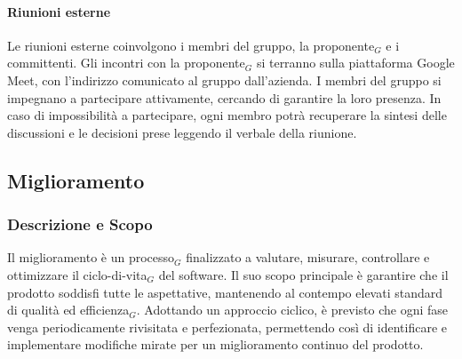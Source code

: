 \documentclass[10pt]{article}
\begin{document}
\begin{justify}
        \paragraph{Riunioni esterne}
        Le riunioni esterne coinvolgono i membri del gruppo, la proponente$_G$ e i committenti. Gli incontri con la proponente$_G$ si terranno sulla piattaforma Google Meet, con l'indirizzo comunicato al gruppo dall'azienda. I membri del gruppo si impegnano a partecipare attivamente, cercando di garantire la loro presenza. In caso di impossibilità a partecipare, ogni membro potrà recuperare la sintesi delle discussioni e le decisioni prese leggendo il verbale della riunione.

    \subsection{Miglioramento}
    \label{miglioramento}
    \subsubsection{Descrizione e Scopo}
    Il miglioramento è un processo$_G$ finalizzato a valutare, misurare, controllare e ottimizzare il ciclo-di-vita$_G$ del software. Il suo scopo principale è garantire che il prodotto soddisfi tutte le aspettative, mantenendo al contempo elevati standard di qualità ed efficienza$_G$.
    Adottando un approccio ciclico, è previsto che ogni fase venga periodicamente rivisitata e perfezionata, permettendo così di identificare e implementare modifiche mirate per un miglioramento continuo del prodotto.\\ 


\end{justify}
\end{document}
